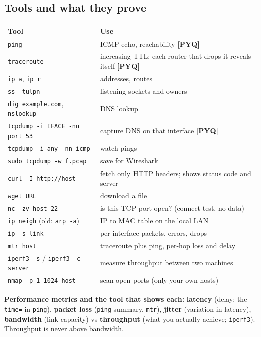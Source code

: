 \documentclass[11pt,a4paper]{article}
\newcommand{\pyq}{\textcolor{ember}{\scriptsize\textbf{[PYQ]}}}
\begin{document}
\subsection{Tools and what they prove}
\begin{center}\small\renewcommand{\arraystretch}{1.18}\setlength{\tabcolsep}{9pt}
\begin{tabularx}{\linewidth}{@{}>{\raggedright\arraybackslash}X>{\raggedright\arraybackslash}X@{}}
\toprule
\textbf{\color{slate}Tool} & \textbf{\color{slate}Use} \\ \midrule
\texttt{ping} & ICMP echo, reachability \pyq{} \\
\texttt{traceroute} & increasing TTL; each router that drops it reveals itself \pyq{} \\
\texttt{ip a}, \texttt{ip r} & addresses, routes \\
\texttt{ss -tulpn} & listening sockets and owners \\
\texttt{dig example.com}, \texttt{nslookup} & DNS lookup \\
\texttt{tcpdump -i IFACE -nn port 53} & capture DNS on that interface \pyq{} \\
\texttt{tcpdump -i any -nn icmp} & watch pings \\
\texttt{sudo tcpdump -w f.pcap} & save for Wireshark \\
\texttt{curl -I http://host} & fetch only HTTP headers; shows status code and server \\
\texttt{wget URL} & download a file \\
\texttt{nc -zv host 22} & is this TCP port open? (connect test, no data) \\
\texttt{ip neigh} (old: \texttt{arp -a}) & IP to MAC table on the local LAN \\
\texttt{ip -s link} & per-interface packets, errors, drops \\
\texttt{mtr host} & traceroute plus ping, per-hop loss and delay \\
\texttt{iperf3 -s} / \texttt{iperf3 -c server} & measure throughput between two machines \\
\texttt{nmap -p 1-1024 host} & scan open ports (only your own hosts) \\
\bottomrule
\end{tabularx}\end{center}
\textbf{Performance metrics and the tool that shows each:} \textbf{latency} (delay; the \texttt{time=} in \texttt{ping}), \textbf{packet loss} (\texttt{ping} summary, \texttt{mtr}), \textbf{jitter} (variation in latency), \textbf{bandwidth} (link capacity) vs \textbf{throughput} (what you actually achieve; \texttt{iperf3}). Throughput is never above bandwidth.
\end{document}
